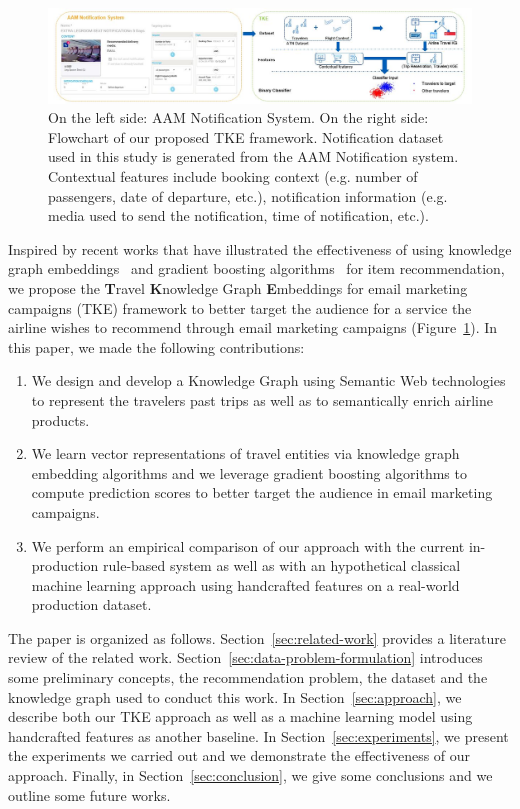 \documentclass[11pt,dvipdfm]{article}
\begin{document}
\begin{figure}[htbp]
  \centering
  \includegraphics[width=\linewidth, height=4 cm]{figs/AAM_Notif_TKE-approach.PNG}
  \caption{On the left side: AAM Notification System. On the right side: Flowchart of our proposed TKE framework. Notification dataset used in this study is generated from the AAM Notification system. Contextual features include booking context (e.g. number of passengers, date of departure, etc.), notification information (e.g. media used to send the notification, time of notification, etc.).}
  \label{fig:TKE-approach}
\end{figure}

Inspired by recent works that have illustrated the effectiveness of using knowledge graph embeddings~\cite{Palumbo18, Sun18, Palumbo20} and gradient boosting algorithms~\cite{Pawel19, Schifferer20} for item recommendation, we propose the \textbf{T}ravel \textbf{K}nowledge Graph \textbf{E}mbeddings for email marketing campaigns (TKE) framework to better target the audience for a service the airline wishes to recommend through email marketing campaigns (Figure~\ref{fig:TKE-approach}). In this paper, we made the following contributions:
\begin{enumerate}
    \item We design and develop a Knowledge Graph using Semantic Web technologies to represent the travelers past trips as well as to semantically enrich airline products. 
    \item We learn vector representations of travel entities via knowledge graph embedding algorithms and we leverage gradient boosting algorithms to compute prediction scores to better target the audience in email marketing campaigns.
    \item We perform an empirical comparison of our approach with the current in-production rule-based system as well as with an hypothetical classical machine learning approach using handcrafted features on a real-world production dataset.
\end{enumerate}

The paper is organized as follows. Section~\ref{sec:related-work} provides a literature review of the related work. Section~\ref{sec:data-problem-formulation} introduces some preliminary concepts, the recommendation problem, the dataset and the knowledge graph used to conduct this work. In Section~\ref{sec:approach}, we describe both our TKE approach as well as a machine learning model using handcrafted features as another baseline. In Section~\ref{sec:experiments}, we present the experiments we carried out and we demonstrate the effectiveness of our approach. Finally, in Section~\ref{sec:conclusion}, we give some conclusions and we outline some future works.
\end{document}
